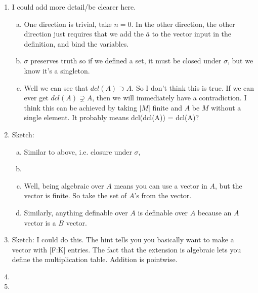 \begin{enumerate}
\item I could add more detail/be clearer here. 
	\begin{enumerate}[a)]
	\item One direction is trivial, take $n = 0$. In the other direction, the other direction just requires that we add the $\bar{a}$ to the vector input in the definition, and bind the variables. 
	
	\item $\sigma$ preserves truth so if we defined a set, it must be closed under $\sigma$, but we know it's a singleton. 
	
	\item Well we can see that $dcl(A) \supset A$. So I don't think this is true. If we can ever get $dcl(A) \supsetneq A$, then we will immediately have a contradiction. I think this can be achieved by taking $|M|$ finite and $A$ be $M$ without a single element. It probably means dcl(dcl(A)) = dcl(A)? %
	
	\end{enumerate}

\item Sketch:
	\begin{enumerate}[a)]
	\item Similar to above, i.e. closure under $\sigma$, 
	
	\item %
	
	\item Well, being algebraic over $A$ means you can use a vector in $A$, but the vector is finite. So take the set of $A$'s from the vector. 
	
	\item Similarly, anything definable over $A$ is definable over $A$ because an $A$ vector is a $B$ vector. 
	
	\end{enumerate}
\item Sketch: I could do this. The hint tells you you basically want to make a vector with [F:K] entries. The fact that the extension is algebraic lets you define the multiplication table. Addition is pointwise. 

\item %

\item %


\end{enumerate}
